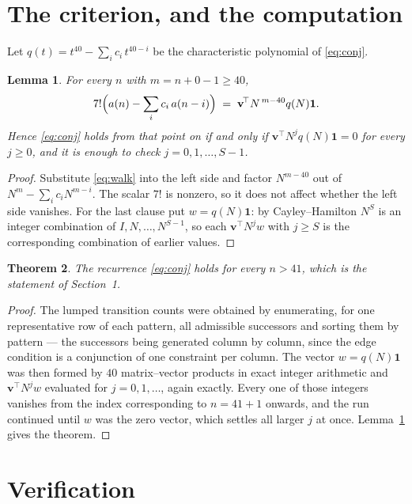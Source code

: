 \documentclass[11pt,a4paper]{article}
\theoremstyle{plain}
\newtheorem{theorem}{Theorem}
\newtheorem{lemma}[theorem]{Lemma}
\theoremstyle{definition}
\begin{document}
\section{The criterion, and the computation}

Let $q(t)=t^{40}-\sum_i c_i\,t^{40-i}$ be the characteristic polynomial of
\eqref{eq:conj}.

\begin{lemma}\label{lem:crit}
For every $n$ with $m=n+0-1\ge40$,
\[
7!\Bigl(a(n)-\sum_i c_i\,a(n-i)\Bigr)\;=\;\mathbf{v}^{\!\top}N^{\,m-40}q(N)\mathbf{1} .
\]
Hence \eqref{eq:conj} holds from that point on if and only if
$\mathbf{v}^{\!\top}N^{j}q(N)\mathbf{1}=0$ for every $j\ge0$, and it is enough to check
$j=0,1,\dots,S-1$.
\end{lemma}

\begin{proof}
Substitute \eqref{eq:walk} into the left side and factor $N^{m-40}$ out of
$N^{m}-\sum_i c_iN^{m-i}$. The scalar $7!$ is nonzero, so it does not affect whether
the left side vanishes. For the last clause put $w=q(N)\mathbf{1}$: by Cayley--Hamilton
$N^{S}$ is an integer combination of $I,N,\dots,N^{S-1}$, so each
$\mathbf{v}^{\!\top}N^{j}w$ with $j\ge S$ is the corresponding combination of earlier
values.
\end{proof}

\begin{theorem}
The recurrence \eqref{eq:conj} holds for every $n>41$, which is the statement of
Section~1.
\end{theorem}

\begin{proof}
The lumped transition counts were obtained by enumerating, for one representative row of
each pattern, all admissible successors and sorting them by pattern --- the successors being
generated column by column, since the edge condition is a conjunction of one constraint per
column. The vector $w=q(N)\mathbf{1}$ was then formed by $40$ matrix--vector products
in exact integer arithmetic and $\mathbf{v}^{\!\top}N^{j}w$ evaluated for
$j=0,1,\dots$, again exactly. Every one of those integers vanishes from the index
corresponding to $n=41+1$ onwards, and the run continued until $w$ was the zero vector,
which settles all larger $j$ at once. Lemma~\ref{lem:crit} gives the theorem.
\end{proof}

\section{Verification}
\end{document}
